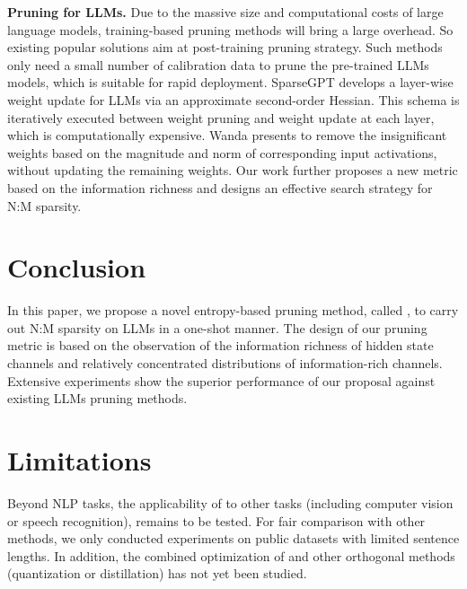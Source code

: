 \textbf{Pruning for LLMs.} Due to the massive size and computational costs of large language models, training-based pruning methods \cite{ma2023llm, xia2023sheared, singh2023exploiting} will bring a large overhead. So existing popular solutions aim at post-training pruning strategy\cite{frantar2023massive, sun2023simple}. Such methods only need a small number of calibration data to prune the pre-trained LLMs models, which is suitable for rapid deployment.
SparseGPT\cite{frantar2023massive} develops a layer-wise weight update for LLMs via an approximate second-order Hessian. This schema is iteratively executed between weight pruning and weight update at each layer, which is computationally expensive.
Wanda\cite{sun2023simple} presents to remove the insignificant weights based on the magnitude and norm of corresponding input activations, without updating the remaining weights.
Our work further proposes a new metric based on the information richness and designs an effective search strategy for N:M sparsity.

\section{Conclusion}

In this paper, we propose a novel entropy-based pruning method, called \name, to carry out N:M sparsity on LLMs in a one-shot manner. 
The design of our pruning metric is based on the observation of the information richness of hidden state channels and relatively concentrated distributions of information-rich channels.
Extensive experiments show the superior performance of our proposal against existing LLMs pruning methods.
\section{Limitations}

Beyond NLP tasks, the applicability of \name to other tasks (including computer vision or speech recognition), remains to be tested. For fair comparison with other methods, we only conducted experiments on public datasets with limited sentence lengths. In addition, the combined optimization of \name and other orthogonal methods (quantization or distillation) has not yet been studied.

\newpage

